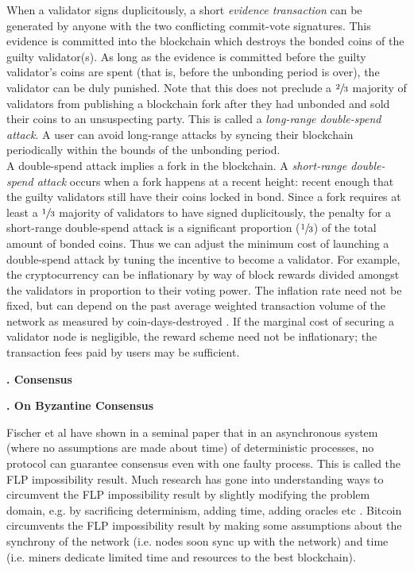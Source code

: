 \documentclass[letter,11pt]{article}
\newcounter{myseccnt}     %
\newcounter{mysubseccnt}  %
\newcommand{\mysection}[1]
{\vspace{9mm}\noindent\fontsize{13pt}{15pt}\setcounter{mysubseccnt}{0}
\stepcounter{myseccnt}\textbf{\arabic{myseccnt}. #1}\normalsize\vspace{5mm}}
\newcommand{\mysubsection}[1]
{\vspace{0mm}\noindent\fontsize{13pt}{15pt}\color{black!50}
\stepcounter{mysubseccnt}\textbf{\arabic{myseccnt}.\arabic{mysubseccnt} #1}\normalsize\vspace{5mm}\color{black}}
\begin{document}
When a validator signs duplicitously, a short \textit{evidence transaction} can be generated by anyone with the two conflicting commit-vote signatures.  This evidence is committed into the blockchain which destroys the bonded coins of the guilty validator(s).  As long as the evidence is committed before the guilty validator’s coins are spent (that is, before the unbonding period is over), the validator can be duly punished.  Note that this does not preclude a $\sfrac{2}{3}$ majority of validators from publishing a blockchain fork after they had unbonded and sold their coins to an unsuspecting party.  This is called a \textit{long-range double-spend attack}.  A user can avoid long-range attacks by syncing their blockchain periodically within the bounds of the unbonding period.\\

A double-spend attack implies a fork in the blockchain.  A \textit{short-range double-spend attack} occurs when a fork happens at a recent height:  recent enough that the guilty validators still have their coins locked in bond.  Since a fork requires at least a $\sfrac{1}{3}$ majority of validators to have signed duplicitously, the penalty for a short-range double-spend attack is a significant proportion ($\sfrac{1}{3}$) of the total amount of bonded coins.  Thus we can adjust the minimum cost of launching a double-spend attack by tuning the incentive to become a validator.  For example, the cryptocurrency can be inflationary by way of block rewards divided amongst the validators in proportion to their voting power.  The inflation rate need not be fixed, but can depend on the past average weighted transaction volume of the network as measured by coin-days-destroyed \cite{conf:daysdestroyed}.  If the marginal cost of securing a validator node is negligible, the reward scheme need not be inflationary;  the transaction fees paid by users may be sufficient.



\mysection{Consensus}

\mysubsection{On Byzantine Consensus}

Fischer et al have shown in a seminal paper \cite{article:fischer} that in an asynchronous system (where no assumptions are made about time) of deterministic processes, no protocol can guarantee consensus even with one faulty process.  This is called the FLP impossibility result.  Much research has gone into understanding ways to circumvent the FLP impossibility result by slightly modifying the problem domain, e.g. by sacrificing determinism, adding time, adding oracles etc \cite{article:correia}.  Bitcoin circumvents the FLP impossibility result by making some assumptions about the synchrony of the network (i.e. nodes soon sync up with the network) and time (i.e. miners dedicate limited time and resources to the best blockchain).\\
\end{document}
